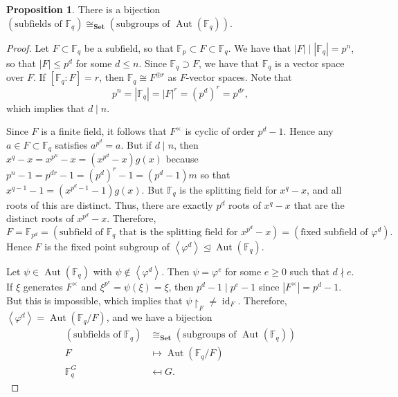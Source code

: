 \documentclass[10pt,letterpaper,cm]{nupset}
\theoremstyle{definition}
\theoremstyle{theorem}
\newtheorem{prop}[definition]{Proposition}
\theoremstyle{remark}
\newcommand{\F}{\mathbb F}
\newcommand{\1}{\mathbf{1}}
\newcommand{\0}{\vec 0}
\DeclareMathOperator{\id}{id}
\DeclareMathOperator{\aut}{Aut}
\begin{document}
\begin{prop}
There is a bijection $\left(\text{subfields of } \F_q\right) \cong_{\mathbf{Set}} \left(\text{subgroups of } \aut(\F_q)\right)$.
\end{prop}
\begin{proof}
Let $F \subset \F_q$ be a subfield, so that $\F_p \subset F \subset \F_q$. We have that $\left\lvert{F}\right\rvert \mid \left\lvert{\F_q}\right\rvert =p^n$, so that $\left\lvert{F}\right\rvert \leq p^d$ for some $d\leq n$. Since $\F_q \supset F$, we have that $\F_q$ is a vector space over $F$. If $\left[\F_q : F\right] = r$, then $\F_q \cong F^{\oplus r}$ as $F$-vector spaces. Note that $$p^n = \left\lvert{\F_q}\right\rvert = \left\lvert{F}\right\rvert^r = \left(p^d\right)^r = p^{dr},$$ which implies that $d \mid n$.

\medskip

 Since $F$ is a finite field, it follows that $F^{\times}$ is cyclic of order $p^d -1$. Hence any $a\in F\subset \F_q$ satisfies $a^{p^d} =a$. But if $ d\mid n$, then $x^q -x = x^{p^n} -x = \left(x^{p^d} -x\right)g(x)$ because $p^n -1 = p^{dr}-1 = \left(p^d\right)^r -1 = \left(p^d -1\right)m$ so that $x^{q-1}-1 = \left(x^{p^d -1} -1\right) g(x)$. But $\F_q$ is the splitting field for $x^q-x$, and all roots of this are distinct. Thus, there are exactly $p^d$ roots of $x^q-x$ that are the distinct roots of $x^{p^d}-x$. Therefore, $$F = \F_{p^d} = \left(\text{subfield of } \F_q \text{ that is the splitting field for } x^{p^d} -x\right)= \left(\text{fixed subfield of } \varphi^d\right).$$ Hence $F$ is the fixed point subgroup of $\left\langle \varphi^d\right\rangle \unlhd \aut(\F_q)$.

\medskip

	Let $\psi \in \aut(\F_q)$ with $\psi \notin \left\langle \varphi^d \right\rangle$. Then $\psi =\varphi^e$ for some $e\geq 0$ such that $d \nmid e$. If $\xi$ generates $F^{\times}$ and $\xi^{p^e} =\psi(\xi) = \xi$, then $p^d -1 \mid p^e-1$ since $\left\lvert{F^{\times}}\right\rvert=p^d-1$. But this is impossible, which implies that $\psi\restriction_F \ne \id_F$. Therefore, $\left\langle \varphi^d \right\rangle =\aut(\F_q/F)$, and we have a bijection 
\begin{align*}
\left(\text{subfields of } \F_q\right) & \cong_{\mathbf{Set}} \left(\text{subgroups of } \aut(\F_q)\right)
\\ F & \mapsto \aut(\F_q/F)
\\  \F_q^G & \mapsfrom G.
\end{align*}
\end{proof}
\end{document}
